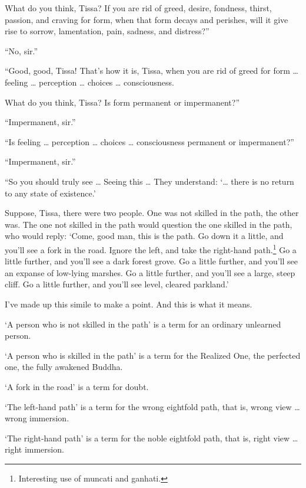 \documentclass[12pt,openany]{book}%
\begin{document}
What do you think, Tissa? If you are rid of greed, desire, fondness, thirst, passion, and craving for form, when that form decays and perishes, will it give rise to sorrow, lamentation, pain, sadness, and distress?” 

“No, sir.” 

“Good, good, Tissa! That’s how it is, Tissa, when you are rid of greed for form … feeling … perception … choices … consciousness. 

What do you think, Tissa? Is form permanent or impermanent?” 

“Impermanent, sir.” 

“Is feeling … perception … choices … consciousness permanent or impermanent?” 

“Impermanent, sir.” 

“So you should truly see … Seeing this … They understand: ‘… there is no return to any state of existence.’ 

Suppose, Tissa, there were two people. One was not skilled in the path, the other was. The one not skilled in the path would question the one skilled in the path, who would reply: ‘Come, good man, this is the path. Go down it a little, and you’ll see a fork in the road. Ignore the left, and take the right-hand path.\footnote{Interesting use of muncati and ganhati. } Go a little further, and you’ll see a dark forest grove. Go a little further, and you’ll see an expanse of low-lying marshes. Go a little further, and you’ll see a large, steep cliff. Go a little further, and you’ll see level, cleared parkland.’ 

I’ve made up this simile to make a point. And this is what it means. 

‘A person who is not skilled in the path’ is a term for an ordinary unlearned person. 

‘A person who is skilled in the path’ is a term for the Realized One, the perfected one, the fully awakened Buddha. 

‘A fork in the road’ is a term for doubt. 

‘The left-hand path’ is a term for the wrong eightfold path, that is, wrong view … wrong immersion. 

‘The right-hand path’ is a term for the noble eightfold path, that is, right view … right immersion. 
\end{document}
